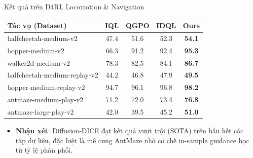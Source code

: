\begin{frame}{Kết quả trên D4RL Locomotion \& Navigation}
    \begin{table}[htbp]
    \centering
    \small
    \begin{tabular}{l||ccc|c}
    \toprule
    \textbf{Tác vụ (Dataset)} & \textbf{IQL} & \textbf{QGPO} & \textbf{IDQL} & \textbf{Ours} \\
    \hline
    halfcheetah-medium-v2        & 47.4 & 51.6 & 52.3 & \textbf{54.1} \\
    hopper-medium-v2             & 66.3 & 91.2 & 92.4 & \textbf{95.3} \\
    walker2d-medium-v2           & 78.3 & 82.5 & 84.1 & \textbf{86.7} \\
    halfcheetah-medium-replay-v2 & 44.2 & 46.8 & 47.9 & \textbf{49.5} \\
    hopper-medium-replay-v2      & 94.7 & 96.1 & 96.8 & \textbf{98.2} \\
    \hline
    antmaze-medium-play-v2       & 71.2 & 72.0 & 73.4 & \textbf{76.8} \\
    antmaze-large-play-v2        & 42.0 & 39.5 & 45.2 & \textbf{51.0} \\
    \bottomrule
    \end{tabular}
    \end{table}
    \begin{itemize}
        \item \textbf{Nhận xét}: Diffusion-DICE đạt kết quả vượt trội (SOTA) trên hầu hết các tập dữ liệu, đặc biệt là mê cung AntMaze nhờ cơ chế in-sample guidance học từ tỷ lệ phân phối.
    \end{itemize}
\end{frame}

